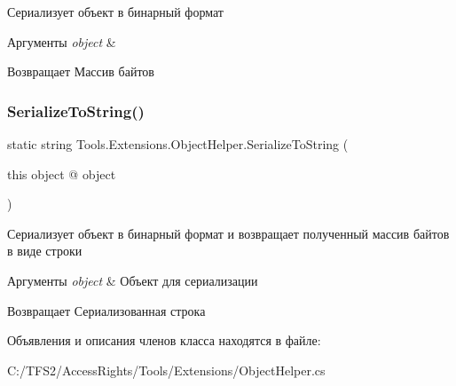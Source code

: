 Сериализует объект в бинарный формат 


\begin{DoxyParams}{Аргументы}
{\em object} & \\
\hline
\end{DoxyParams}
\begin{DoxyReturn}{Возвращает}
Массив байтов
\end{DoxyReturn}
\mbox{\label{class_tools_1_1_extensions_1_1_object_helper_ac2cdaa919baa35f0cc0e69761e04c86b}} 
\subsubsection{\texorpdfstring{Serialize\+To\+String()}{SerializeToString()}}
{\footnotesize\ttfamily static string Tools.\+Extensions.\+Object\+Helper.\+Serialize\+To\+String (\begin{DoxyParamCaption}\item[{this object @}]{object }\end{DoxyParamCaption})\hspace{0.3cm}{\ttfamily [static]}}



Сериализует объект в бинарный формат и возвращает полученный массив байтов в виде строки 


\begin{DoxyParams}{Аргументы}
{\em object} & Объект для сериализации\\
\hline
\end{DoxyParams}
\begin{DoxyReturn}{Возвращает}
Сериализованная строка
\end{DoxyReturn}


Объявления и описания членов класса находятся в файле\+:\begin{DoxyCompactItemize}
\item 
C\+:/\+T\+F\+S2/\+Access\+Rights/\+Tools/\+Extensions/Object\+Helper.\+cs\end{DoxyCompactItemize}
